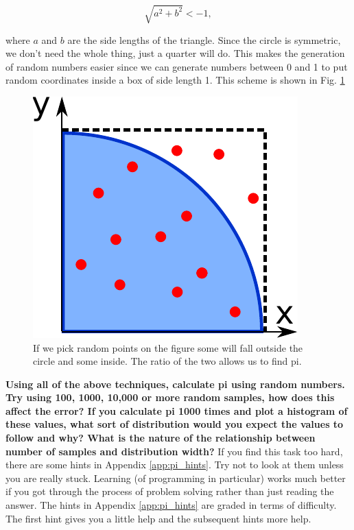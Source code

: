 	\begin{equation}
	\sqrt{a^2+b^2} <- 1,
	\end{equation}

	where $a$ and $b$ are the side lengths of the triangle. Since the circle is symmetric, we don't need the whole thing, just a quarter will do. This makes the generation of random numbers easier since we can generate numbers between 0 and 1 to put random coordinates inside a box of side length 1. This scheme is shown in Fig. \ref{fig:piarc}

	\begin{figure}[h]
		\centering
		\includegraphics[scale=0.6]{images/piarc}
		\caption{If we pick random points on the figure some will fall outside the circle and some inside. The ratio of the two allows us to find pi.}
		\label{fig:piarc}
	\end{figure}

	\textbf{Using all of the above techniques, calculate pi using random numbers. Try using 100, 1000, 10,000 or more random samples, how does this affect the error? If you calculate pi 1000 times and plot a histogram of these values, what sort of distribution would you expect the values to follow and why? What is the nature of the relationship between number of samples and distribution width?}
	If you find this task too hard, there are some hints in Appendix \ref{app:pi_hints}. Try not to look at them unless you are really stuck. Learning (of programming in particular) works much better if you got through the process of problem solving rather than just reading the answer. The hints in Appendix \ref{app:pi_hints} are graded in terms of difficulty. The first hint gives you a little help and the subsequent hints more help.